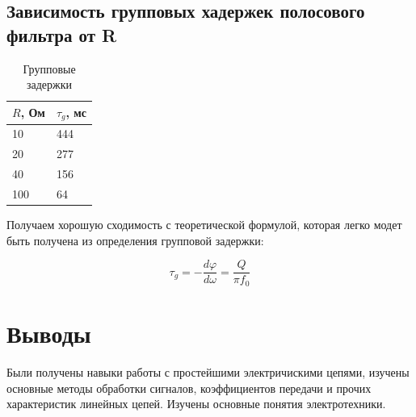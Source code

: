 \documentclass[a4paper, 12pt]{article}
\begin{document}
\subsection*{Зависимость групповых хадержек полосового фильтра от R}

\begin{table}[H]
\centering
\begin{tabular}{|l|l|}
\hline
\textbf{$R$, Ом} & \textbf{$\tau_g$, мс} \\ \hline
10               & 444                   \\ \hline
20               & 277                   \\ \hline
40               & 156                   \\ \hline
100              & 64                    \\ \hline
\end{tabular}
\caption{Групповые задержки}
\label{my-label}
\end{table}

Получаем хорошую сходимость с теоретической формулой, которая легко модет быть получена из определения групповой задержки:

$$\tau_g = -\frac{d\varphi}{d\omega} = \frac{Q}{\pi f_0}$$

\section*{Выводы}
Были получены навыки работы с простейшими электричискими цепями, изучены основные методы обработки сигналов, коэффициентов передачи и прочих характеристик линейных цепей. Изучены основные понятия электротехники. 
\end{document}
